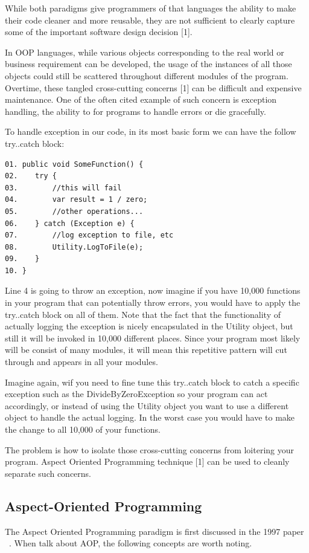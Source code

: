 While both paradigms give programmers of that languages the ability to make their code cleaner and more reusable, they are not sufficient to clearly capture some of the important software design decision [1].

In OOP languages, while various objects corresponding to the real world or business requirement can be developed, the usage of the instances of all those objects could still be scattered throughout different modules of the program. Overtime, these tangled cross-cutting concerns [1] can be difficult and expensive maintenance. One of the often cited example of such concern is exception handling, the ability to for programs to handle errors or die gracefully.

To handle exception in our code, in its most basic form we can have the follow try..catch block:
\begin{verbatim}
01. public void SomeFunction() {
02.    try {
03.        //this will fail
04.        var result = 1 / zero;
05.        //other operations...
06.    } catch (Exception e) {
07.        //log exception to file, etc
08.        Utility.LogToFile(e);
09.    }
10. }
\end{verbatim}

Line 4 is going to throw an exception, now imagine if you have 10,000 functions in your program that can potentially throw errors, you would have to apply the try..catch block on all of them. Note that the fact that the functionality of actually logging the exception is nicely encapsulated in the Utility object, but still it will be invoked in 10,000 different places. Since your program most likely will be consist of many modules, it will mean this repetitive pattern will cut through and appears in all your modules.

Imagine again, wif you need to fine tune this try..catch block to catch a specific exception such as the DivideByZeroException so your program can act accordingly, or instead of using the Utility object you want to use a different object to handle the actual logging. In the worst case you would have to make the change to all 10,000 of your functions.

The problem is how to isolate those cross-cutting concerns from loitering your program. Aspect Oriented Programming technique [1] can be used to cleanly separate such concerns.

\subsection{Aspect-Oriented Programming}
The Aspect Oriented Programming paradigm is first discussed in the 1997 paper ~\cite{aop}. When talk about AOP, the following concepts are worth noting.

